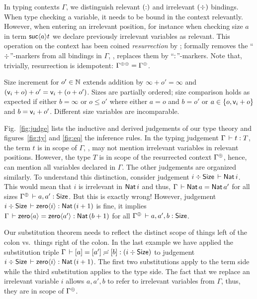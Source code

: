 \documentclass[acmlarge,review,anonymous]{acmart}\settopmatter{printfolios=true}
\begin{document}


In typing contexts $\Gamma$, we distinguish relevant $(\mathord{:})$ and irrelevant $(\mathord{\div})$ bindings.
When type checking a variable, it needs to be bound in the context relevantly.  However, when entering an irrelevant position, for instance when checking size $a$ in term $\mathsf{suc}\langle a\rangle t$ we declare previously irrelevant variables as relevant.
This operation on the context has been coined
\emph{resurrection} by \citet{pfenning:lics01}; formally \fbox{$\resurrect\Gamma$} removes
the ``$\mathord{\div}$''-markers from all bindings in $\Gamma$, \ie, replaces
them by ``$\mathord{:}$''-markers.  Note that, trivially, resurrection is idempotent: $\resurrecttwice\Gamma = \resurrect{\Gamma}$.

Size increment  for $o' \in \mathbb{N}$ extends addition by $\infty + o' = \infty$ and $(\mathsf{v}_{i} + o) + o' = \mathsf{v}_{i} + (o + o')$.  Sizes are partially ordered; size comparison  holds as expected if either $b = \infty$ or  $o \leq o'$ where either $a = o$ and $b = o'$ or $a \in \{ o, \mathsf{v}_{i} + o \}$ and $b = \mathsf{v}_{i} + o'$.
Different size variables are incomparable.




Fig.~\ref{fig:judge} lists the inductive and derived judgements of our type theory and
figures~\ref{fig:ty} and \ref{fig:eq} the inference rules.
In the typing judgement $\Gamma \,\vdash t : T$, the term $t$ is in scope of
$\Gamma$, \ie, may not mention irrelevant variables in relevant
positions.  However, the type $T$ is in scope of the resurrected
context $\resurrect\Gamma$, hence, can mention all variables declared
in $\Gamma$.  The other judgements are organized similarly.  To
understand this distinction, consider judgement
$i \div \mathsf{Size} \,\vdash \mathsf{Nat}\, i$.  This would mean that $i$ is irrelevant in
$\mathsf{Nat}\, i$ and thus, $\Gamma \,\vdash \mathsf{Nat}\, a = \mathsf{Nat}\, {a'}$ for all sizes
$\resurrect\Gamma \der a,a' : \Size$.  But this is exactly wrong!  However,
judgement $i \div \mathsf{Size} \,\vdash \mathsf{zero}\langle i\rangle : \mathsf{Nat}\, (i + 1)$ is fine, it
implies $\Gamma \,\vdash \mathsf{zero}\langle a\rangle = \mathsf{zero}\langle a'\rangle : \mathsf{Nat}\, (b+1)$ for all
$\resurrect\Gamma \der a,a',b : \Size$.

Our substitution theorem
needs to reflect the distinct scope of things left of the colon vs.\
things right of the colon.  In the last example we have applied the
substitution triple $\Gamma \,\vdash [a] = [a'] \risingdotseq [b] : (i \div \mathsf{Size})$
to judgement $i \div \mathsf{Size} \,\vdash \mathsf{zero}\langle i\rangle : \mathsf{Nat}\, (i + 1)$.
The first two substitutions apply to the term side while the third
substitution applies to the type side.  The fact that we replace an
irrelevant variable $i$ allows $a,a',b$ to refer to irrelevant
variables from $\Gamma$, thus, they are in scope of $\resurrect\Gamma$.
\end{document}
